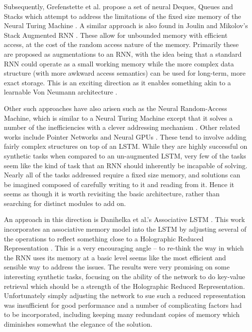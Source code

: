 Subsequently, Grefenstette et al. propose a set of neural Deques, Queues and Stacks which attempt to
address the limitations of the fixed size memory of the Neural Turing Machine 
\autocite{Grefenstette2015}. A similar approach is also found in Joulin and Mikolov's Stack Augmented
RNN \autocite{Joulin2015}. These allow for unbounded memory with efficient access, at the cost of
the random access nature of the memory. Primarily these are proposed as augmentations to an RNN,
with the idea being that a standard RNN could operate as a small working memory while the more
complex data structure (with more awkward access semantics) can be used for long-term, more exact
storage. This is an exciting direction as it enables something akin to a learnable Von Neumann
architecture \autocite{Graves2014}.

Other such approaches have also arisen such as the Neural Random-Access Machine, which is similar to
a Neural Turing Machine except that it solves a number of the inefficiencies with a clever addressing
mechanism \autocite{Kurach2016}. Other related works include Pointer Networks \autocite{Vinyals2015}
and Neural GPUs \autocite{Kaiser2015}. These tend to involve adding fairly complex structures on
top of an LSTM. While they are highly successful on synthetic tasks when compared to an
un-augmented LSTM, very few of the tasks seem like the kind of task that an RNN should inherently be
incapable of solving. Nearly all of the tasks addressed require a fixed size memory, and solutions
can be imagined composed of carefully writing to it and reading from it. Hence it seems as though it
is worth revisiting the basic architecture, rather than searching for distinct modules to add on.

An approach in this direction is Danihelka et al.'s Associative LSTM \autocite{Danihelka2016}. 
This work incorporates an associative memory model into the LSTM by adjusting several of the
operations to reflect something close to a Holographic Reduced Representation \autocite{Plate1995}.
This is a very encouraging angle -- to re-think the way in which the RNN uses its memory at a basic
level seems like the most efficient and sensible way to address the issues. The results were
very promising on some interesting synthetic tasks, focusing on the ability of the network to do
key-value retrieval which should be a strength of the Holographic Reduced Representation.
Unfortunately simply adjusting the network to sue such a reduced representation was insufficient for
good performance and a number of complicating factors had to be incorporated, including keeping many
redundant copies of memory which diminishes somewhat the elegance of the solution.

